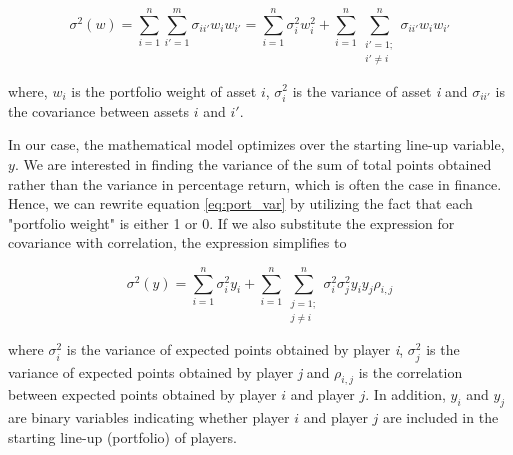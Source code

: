 \begin{equation}
    \sigma^2(w) = \sum_{i = 1}^{n}\sum_{i' = 1}^{m}\sigma_{ii'}w_{i}w_{i'} = \sum_{i = 1}^{n}\sigma_{i}^2w_i^2 + \sum_{i = 1}^{n}\sum_{\substack{i' = 1;\\ i' \neq i}}^{n}\sigma_{ii'}w_iw_{i'}
    \label{eq:port_var}
\end{equation}

where, $w_i$ is the portfolio weight of asset $i$, $\sigma_{i}^2$ is the variance of asset \textit{i} and $\sigma_{ii'}$ is the covariance between assets $i$ and $i'$. 

\newpar

In our case, the mathematical model optimizes over the starting line-up variable, $y$. We are interested in finding the variance of the sum of total points obtained rather than the variance in percentage return, which is often the case in finance. Hence, we can rewrite equation \ref{eq:port_var} by utilizing the fact that each "portfolio weight" is either 1 or 0. If we also substitute the expression for covariance with correlation, the expression simplifies to

\begin{equation}
    \sigma^2(y) = \sum_{i = 1}^{n}\sigma_i^2y_i + \sum_{i = 1}^{n}\sum_{\substack{j = 1;\\ j \neq i}}^{n} \sigma_i^{2}\sigma_j^{2}y_{i}y_{j}\rho_{i,j}
    \label{eq:team_var}
\end{equation}

where $\sigma_{i}^2$ is the variance of expected points obtained by player \textit{i}, $\sigma_{j}^2$ is the variance of expected points obtained by player \textit{j} and $\rho_{i,j}$ is the correlation between expected points obtained by player $i$ and player $j$. In addition, $y_i$ and $y_j$ are binary variables indicating whether player $i$ and player $j$ are included in the starting line-up
(portfolio) of players.\newline

